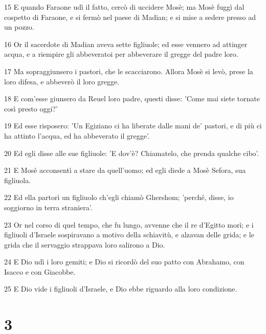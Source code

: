 \par 15 E quando Faraone udì il fatto, cercò di uccidere Mosè; ma Mosè fuggì dal cospetto di Faraone, e si fermò nel paese di Madian; e si mise a sedere presso ad un pozzo.
\par 16 Or il sacerdote di Madian aveva sette figliuole; ed esse vennero ad attinger acqua, e a riempire gli abbeveratoi per abbeverare il gregge del padre loro.
\par 17 Ma sopraggiunsero i pastori, che le scacciarono. Allora Mosè si levò, prese la loro difesa, e abbeverò il loro gregge.
\par 18 E com'esse giunsero da Reuel loro padre, questi disse: 'Come mai siete tornate così presto oggi?'
\par 19 Ed esse risposero: 'Un Egiziano ci ha liberate dalle mani de' pastori, e di più ci ha attinto l'acqua, ed ha abbeverato il gregge'.
\par 20 Ed egli disse alle sue figliuole: 'E dov'è? Chiamatelo, che prenda qualche cibo'.
\par 21 E Mosè acconsentì a stare da quell'uomo; ed egli diede a Mosè Sefora, sua figliuola.
\par 22 Ed ella partorì un figliuolo ch'egli chiamò Ghershom; 'perché, disse, io soggiorno in terra straniera'.
\par 23 Or nel corso di quel tempo, che fu lungo, avvenne che il re d'Egitto morì; e i figliuoli d'Israele sospiravano a motivo della schiavitù, e alzavan delle grida; e le grida che il servaggio strappava loro salirono a Dio.
\par 24 E Dio udì i loro gemiti; e Dio si ricordò del suo patto con Abrahamo, con Isacco e con Giacobbe.
\par 25 E Dio vide i figliuoli d'Israele, e Dio ebbe riguardo alla loro condizione.

\chapter{3}


